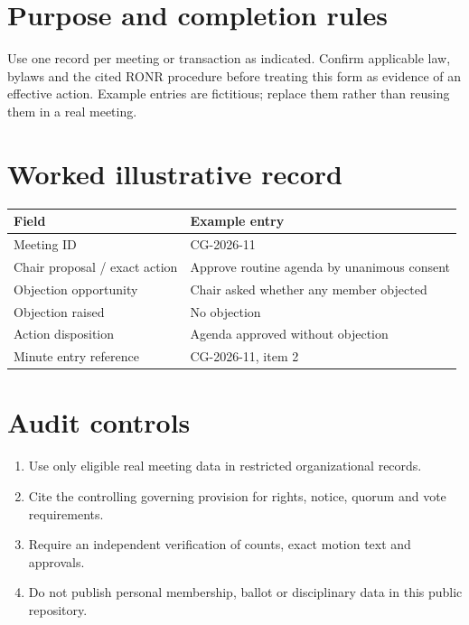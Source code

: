 \documentclass[11pt]{article}
\begin{document}
\SuiteOpen
\section{Purpose and completion rules}
Use one record per meeting or transaction as indicated. Confirm applicable law, bylaws and the cited RONR procedure before treating this form as evidence of an effective action. Example entries are fictitious; replace them rather than reusing them in a real meeting.

\section{Worked illustrative record}
\begin{longtable}{@{}p{.38\linewidth}p{.55\linewidth}@{}}\toprule Field & Example entry\\\midrule\endhead


Meeting ID & CG-2026-11\\
Chair proposal / exact action & Approve routine agenda by unanimous consent\\
Objection opportunity & Chair asked whether any member objected\\
Objection raised & No objection\\
Action disposition & Agenda approved without objection\\
Minute entry reference & CG-2026-11, item 2\\
\bottomrule\end{longtable}
\section{Audit controls}
\begin{enumerate}[leftmargin=*,itemsep=4pt]
\item Use only eligible real meeting data in restricted organizational records.
\item Cite the controlling governing provision for rights, notice, quorum and vote requirements.
\item Require an independent verification of counts, exact motion text and approvals.
\item Do not publish personal membership, ballot or disciplinary data in this public repository.
\end{enumerate}
\end{document}
